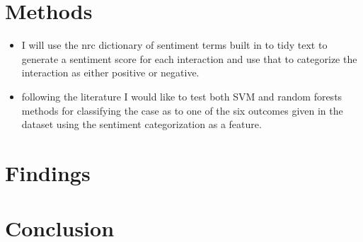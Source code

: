 \documentclass{article}
\begin{document}
\section{Methods}
\begin{itemize}
    \item I will use the nrc dictionary of sentiment terms built in to tidy text to generate a sentiment score for each interaction and use that to categorize the interaction as either positive or negative.
    \item following the literature I would like to test both SVM and random forests methods for classifying the case as to one of the six outcomes given in the dataset using the sentiment categorization as a feature. 
\end{itemize}
\section{Findings}

\section{Conclusion}


 \citep{liu_two-phase_2018}
 \citep{liu_web_2011}
 \citep{sulea_exploring_2017}
 \citep{noauthor_sentiment_nodate}



\end{document}
